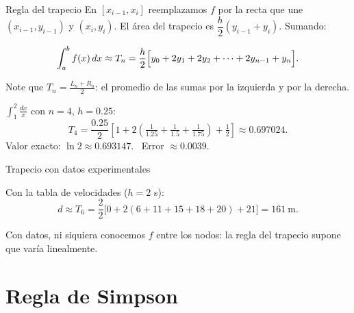 \documentclass[10pt,aspectratio=169]{beamer}
\begin{document}
\begin{frame}{Regla del trapecio}
  En $[x_{i-1},x_i]$ reemplazamos $f$ por la recta que une $(x_{i-1},y_{i-1})$ y $(x_i,y_i)$. El área del trapecio es
  $\dfrac h2(y_{i-1}+y_i)$. Sumando:
  \begin{teorema}
    \[ \int_a^bf(x)\,dx\approx T_n=\frac h2\Big[y_0+2y_1+2y_2+\dots+2y_{n-1}+y_n\Big]. \]
  \end{teorema}
  Note que $T_n=\frac{L_n+R_n}{2}$: el promedio de las sumas por la izquierda y por la derecha.
  \begin{ejemplo}[1]
    $\displaystyle\int_1^2\frac{dx}{x}$ con $n=4$, $h=0.25$:
    \[ T_4=\frac{0.25}{2}\left[1+2\left(\tfrac{1}{1.25}+\tfrac1{1.5}+\tfrac1{1.75}\right)+\tfrac12\right]\approx0.697024. \]
    Valor exacto: $\ln2\approx0.693147$. \ Error $\approx0.0039$.
  \end{ejemplo}
\end{frame}

\begin{frame}{Trapecio con datos experimentales}
  \begin{ejemplo}[2]
    Con la tabla de velocidades ($h=2$ s):
    \[ d\approx T_6=\frac22\Big[0+2(6+11+15+18+20)+21\Big]=161\ \text{m}. \]
  \end{ejemplo}
  \begin{center}
  \end{center}
  \small Con datos, ni siquiera conocemos $f$ entre los nodos: la regla del trapecio supone que varía linealmente.
\end{frame}

\section{Regla de Simpson}
\end{document}

